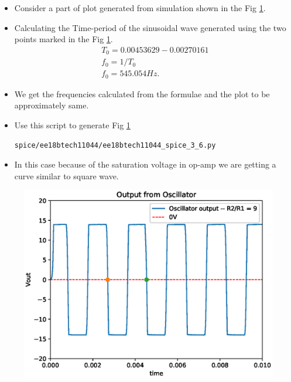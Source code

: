 \begin{enumerate}[label=\arabic*.,ref=\theenumi]
 \solution
 \begin{itemize}
     \item Consider a part of plot generated from simulation shown in the Fig \ref{fig:ee18btech11044_3_13}.
     \item Calculating the Time-period of the sinusoidal wave generated using the two points marked in the Fig \ref{fig:ee18btech11044_3_13}.
     \begin{align}
         T_0 = 0.00453629 - 0.00270161 \\
         f_0 = 1/T_0 \\
         f_0 = 545.054Hz.
     \end{align}
     \item We get the frequencies calculated from the formulae and the plot to be approximately same.
     \item Use this script to generate Fig \ref{fig:ee18btech11044_3_13}
\begin{lstlisting}
spice/ee18btech11044/ee18btech11044_spice_3_6.py
\end{lstlisting}
\item In this case because of the saturation voltage in op-amp we are getting a curve similar to square wave.
 \end{itemize}
 

 
\begin{figure}[!ht]
\centering
\includegraphics[width=\columnwidth]{./figs/ee18btech11044/ee18btech11044_3_13.eps}
\caption{}
\label{fig:ee18btech11044_3_13}
\end{figure}



\end{enumerate}
